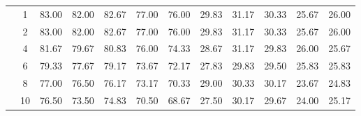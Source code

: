 \begin{table}[H]
\begin{tabular}{|c|c|c c c c c|c c c c c|}
\multicolumn{1}{|c|}{ \multirow{6}{*}{\rotatebox[origin=c]{90}{\textbf{K-vizinhos}}} }
&1	&83.00	&82.00	&82.67	&77.00	&76.00	&29.83	&31.17	&30.33	&25.67	&26.00\\\cline{2-12}
&2	&83.00	&82.00	&82.67	&77.00	&76.00	&29.83	&31.17	&30.33	&25.67	&26.00\\\cline{2-12}
&4	&81.67	&79.67	&80.83	&76.00	&74.33	&28.67	&31.17	&29.83	&26.00	&25.67\\\cline{2-12}
&6	&79.33	&77.67	&79.17	&73.67	&72.17	&27.83	&29.83	&29.50	&25.83	&25.83\\\cline{2-12}
&8	&77.00	&76.50	&76.17	&73.17	&70.33	&29.00	&30.33	&30.17	&23.67	&24.83\\\cline{2-12}
&10	&76.50	&73.50	&74.83	&70.50	&68.67	&27.50	&30.17	&29.67	&24.00	&25.17%

\\\midrule

	\end{tabular}
\end{table}


